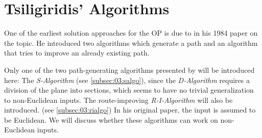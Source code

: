 \section{Tsiligiridis' Algorithms}
\label{sec:03:tsiligiridis}

One of the earliest solution approaches for the OP is due to \citeauthor{tsiligiridis_heuristic_1984} in his 1984 paper on the topic. \cite{tsiligiridis_heuristic_1984}
He introduced two algorithms which generate a path and an algorithm that tries to improve an already existing path.

Only one of the two path-generating algorithms presented by \citeauthor{tsiligiridis_heuristic_1984} will be introduced here:
The \emph{S-Algorithm} (see \cref{subsec:03:salgo}), since the \emph{D-Algorithm} requires a division of the plane into sections, which seems to have no trivial generalization to non-Euclidean inputs.
The route-improving \emph{R-I-Algorithm} will also be introduced. (see \cref{subsec:03:rialgo})
In his original paper, the input is assumed to be Euclidean. 
We will discuss whether these algorithms can work on non-Euclidean inputs.




